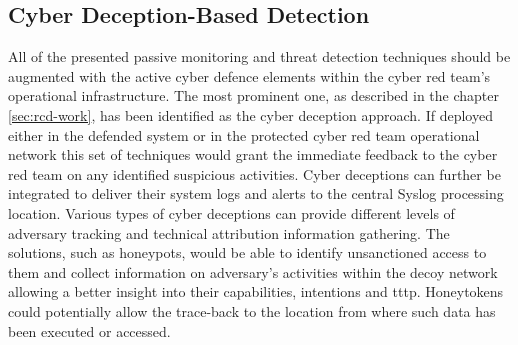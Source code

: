 \subsection{Cyber Deception-Based Detection}
All of the presented passive monitoring and threat detection techniques should be augmented with the active cyber defence elements within the cyber red team's operational infrastructure.
The most prominent one, as described in the chapter \ref{sec:rcd-work}, has been identified as the cyber deception approach.
If deployed either in the defended system or in the protected cyber red team operational network this set of techniques would grant the immediate feedback to the cyber red team on any identified suspicious activities.
Cyber deceptions can further be integrated to deliver their system logs and alerts to the central Syslog processing location.
Various types of cyber deceptions can provide different levels of adversary tracking and technical attribution information gathering. The solutions, such as honeypots, would be able to identify unsanctioned access to them and collect information on adversary's activities within the decoy network allowing a better insight into their capabilities, intentions and \gls{tttp}.
Honeytokens could potentially allow the trace-back to the location from where such data has been executed or accessed.

